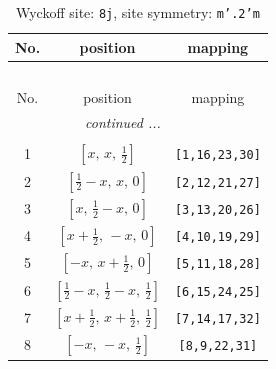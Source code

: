 \documentclass[fleqn,8pt]{jsarticle}
\begin{document}
\begin{longtable}{ccc}
\caption{Wyckoff site: {\tt 8j}, site symmetry: {\tt m'.2'm}}
 \\
 \hline \hline
No. & position & mapping \\ \hline \endfirsthead

\multicolumn{2}{l}{\tablename\ \thetable{}} \\
 \hline \hline
No. & position & mapping \\ \hline \endhead

 \hline \hline
\multicolumn{2}{r}{\footnotesize\it continued ...} \\ \endfoot

 \hline \hline
\multicolumn{2}{r}{} \\ \endlastfoot

1 & $\left[ x,\, x,\, \frac{1}{2} \right]$ & {\tt [1,16,23,30]} \\ \hline
2 & $\left[ \frac{1}{2} - x,\, x,\, 0 \right]$ & {\tt [2,12,21,27]} \\ \hline
3 & $\left[ x,\, \frac{1}{2} - x,\, 0 \right]$ & {\tt [3,13,20,26]} \\ \hline
4 & $\left[ x + \frac{1}{2},\, - x,\, 0 \right]$ & {\tt [4,10,19,29]} \\ \hline
5 & $\left[ - x,\, x + \frac{1}{2},\, 0 \right]$ & {\tt [5,11,18,28]} \\ \hline
6 & $\left[ \frac{1}{2} - x,\, \frac{1}{2} - x,\, \frac{1}{2} \right]$ & {\tt [6,15,24,25]} \\ \hline
7 & $\left[ x + \frac{1}{2},\, x + \frac{1}{2},\, \frac{1}{2} \right]$ & {\tt [7,14,17,32]} \\ \hline
8 & $\left[ - x,\, - x,\, \frac{1}{2} \right]$ & {\tt [8,9,22,31]} \\
\end{longtable}
\renewcommand{\arraystretch}{1.2}
\end{document}
